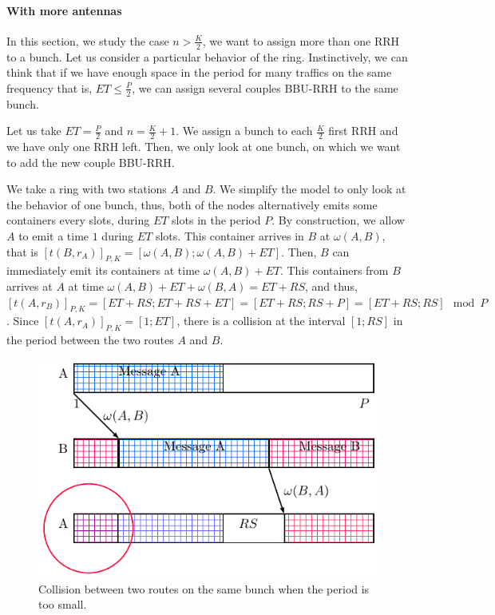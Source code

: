 \documentclass[a4paper,10pt,english]{article}
\begin{document}
\paragraph{With more antennas}
\label{sec:optialgo}
 In this section, we study the case $n > \frac{K}{2}$, we want to assign more than one RRH to a bunch. 
 Let us consider a particular behavior of the ring. Instinctively, we can think that if we have enough space in the period for many traffics on the same frequency that is, $ET \le \frac{P}{2}$, we can assign several couples BBU-RRH to the same bunch.

 Let us take $ET =  \frac{P}{2}$ and $n = \frac{K}{2} + 1$. We assign a bunch to each $\frac{K}{2}$ first RRH and we have only one RRH left. Then, we only look at one bunch, on which we want to add the new couple BBU-RRH. 
 
 We take a ring with two stations $A$ and $B$. We simplify the model to only look at the behavior of one bunch, thus, both of the nodes alternatively emits some containers every slots, during $ET$ slots in the period $P$. By construction, we allow $A$ to emit a time $1$ during $ET$ slots. This container arrives in $B$ at $\omega(A,B)$, that is  $[t(B,r_A)]_{P,K} = [\omega(A,B);\omega(A,B)+ET]$. Then, $B$ can immediately emit its containers at time $\omega(A,B)+ET$. This containers from $B$ arrives at $A$ at time $\omega(A,B)+ET + \omega(B,A) = ET + RS$, and thus, $[t(A,r_B)]_{P,K} = [ET + RS;ET + RS + ET] = [ET+RS; RS + P] = [ET + RS; RS] \mod P$. Since $[t(A,r_A)]_{P,K} = [1;ET]$, there is a collision at the interval $[1;RS]$ in the period between the two routes $A$ and $B$.
  \begin{figure}[h]
\centering
      \includegraphics[scale=0.7]{rs.pdf}
     \caption{Collision between two routes on the same bunch when the period is too small.}   \label{fig:proofrs}
  \end{figure}
\end{document}
